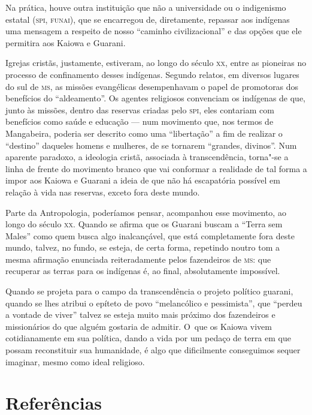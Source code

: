 Na prática, houve outra instituição que não a universidade ou o
indigenismo estatal (\textsc{spi}, \textsc{funai}), que se encarregou de, diretamente,
repassar aos indígenas uma mensagem a respeito de nosso ``caminho
civilizacional'' e das opções que ele permitira aos Kaiowa e Guarani. 

Igrejas cristãs, justamente, estiveram, ao longo do século \textsc{xx}, entre as
pioneiras no processo de confinamento desses indígenas. Segundo
relatos, em diversos lugares do sul de \textsc{ms}, as missões evangélicas
desempenhavam o papel de promotoras dos benefícios do ``aldeamento''. Os
agentes religiosos convenciam os indígenas de que, junto às missões,
dentro das reservas criadas pelo \textsc{spi}, eles contariam com benefícios
como saúde e educação --- num movimento que, nos termos de Mangabeira,
poderia ser descrito como uma ``libertação'' a fim de realizar o
``destino'' daqueles homens e mulheres, de se tornarem ``grandes,
divinos''. Num aparente paradoxo, a ideologia cristã, associada à
transcendência, torna"-se a linha de frente do movimento branco que vai
conformar a realidade de tal forma a impor aos Kaiowa e Guarani a ideia
de que não há escapatória possível em relação à vida nas reservas,
exceto fora deste mundo. 

Parte da Antropologia, poderíamos pensar, acompanhou esse movimento, ao
longo do século \textsc{xx}. Quando se afirma que os Guarani buscam a ``Terra sem
Males'' como quem busca algo inalcançável, que está completamente fora
deste mundo, talvez, no fundo, se esteja, de certa forma, repetindo
noutro tom a mesma afirmação enunciada reiteradamente pelos fazendeiros
de \textsc{ms}: que recuperar as terras para os indígenas é, ao final,
absolutamente impossível.

Quando se projeta para o campo da transcendência o projeto político
guarani, quando se lhes atribui o epíteto de povo ``melancólico e
pessimista'', que ``perdeu a vontade de viver'' talvez se esteja muito
mais próximo dos fazendeiros e missionários do que alguém gostaria de
admitir. O~que os Kaiowa vivem cotidianamente em sua política, dando a
vida por um pedaço de terra em que possam reconstituir sua humanidade,
é algo que dificilmente conseguimos sequer imaginar, mesmo como ideal
religioso.

\section{Referências}

